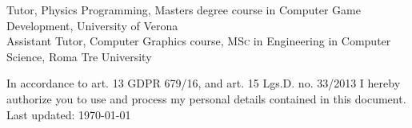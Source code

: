 \documentclass[11pt, a4paper]{article} %
\newcommand{\years}[1]{\marginnote{\scriptsize #1}} %
\begin{document}
\years{2019} Tutor, Physics Programming, Masters degree course in Computer Game Development, University of Verona\\
\years{2016} Assistant Tutor, Computer Graphics course, \textsc{MSc} in Engineering in Computer Science, Roma Tre University\\




\vfill{} %


\begin{center}
{\scriptsize In accordance to art. 13 GDPR 679/16, and art. 15 Lgs.D. no. 33/2013 I hereby authorize you to use and process my personal details contained in this document.\\ Last updated: \today} %
\end{center}

\end{document}
